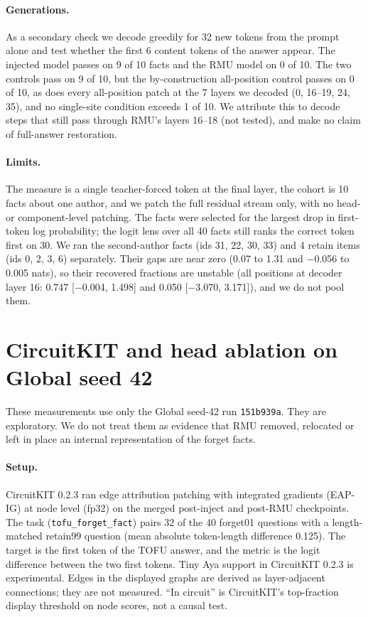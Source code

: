 \documentclass[10pt,twocolumn]{article}
\newcommand{\code}[1]{\texttt{#1}}
\begin{document}
\paragraph{Generations.} As a secondary check we decode greedily for 32 new tokens from the prompt alone and test whether the first 6 content tokens of the answer appear. The injected model passes on 9 of 10 facts and the RMU model on 0 of 10. The two controls pass on 9 of 10, but the by-construction all-position control passes on 0 of 10, as does every all-position patch at the 7 layers we decoded (0, 16--19, 24, 35), and no single-site condition exceeds 1 of 10. We attribute this to decode steps that still pass through RMU's layers 16--18 (not tested), and make no claim of full-answer restoration.

\paragraph{Limits.} The measure is a single teacher-forced token at the final layer, the cohort is 10 facts about one author, and we patch the full residual stream only, with no head- or component-level patching. The facts were selected for the largest drop in first-token log probability; the logit lens over all 40 facts still ranks the correct token first on 30. We ran the second-author facts (ids 31, 22, 30, 33) and 4 retain items (ids 0, 2, 3, 6) separately. Their gaps are near zero (0.07 to 1.31 and $-$0.056 to 0.005 nats), so their recovered fractions are unstable (all positions at decoder layer 16: 0.747 [$-$0.004, 1.498] and 0.050 [$-$3.070, 3.171]), and we do not pool them.


\section{CircuitKIT and head ablation on Global seed 42}
\label{app:circuit}
These measurements use only the Global seed-42 run \code{151b939a}. They are exploratory. We do not treat them as evidence that RMU removed, relocated or left in place an internal representation of the forget facts.

\paragraph{Setup.} CircuitKIT 0.2.3 ran edge attribution patching with integrated gradients (EAP-IG) at node level (fp32) on the merged post-inject and post-RMU checkpoints. The task (\code{tofu\_forget\_fact}) pairs 32 of the 40 forget01 questions with a length-matched retain99 question (mean absolute token-length difference 0.125). The target is the first token of the TOFU answer, and the metric is the logit difference between the two first tokens. Tiny Aya support in CircuitKIT 0.2.3 is experimental. Edges in the displayed graphs are derived as layer-adjacent connections; they are not measured. ``In circuit'' is CircuitKIT's top-fraction display threshold on node scores, not a causal test.
\end{document}

